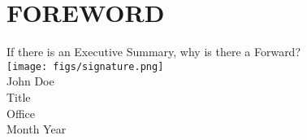 \section*{FOREWORD}

\begin{it}
  \hskip 0.25in
  If there is an Executive Summary, why is there a Forward?\\[0.15in]
\texttt{[image: figs/signature.png]}
\\[0.15in]
John Doe
\\[0.0in]
Title
\\[0.0in]
Office
\\[0.15in]
Month Year

\end{it}

\cleardoublepage

